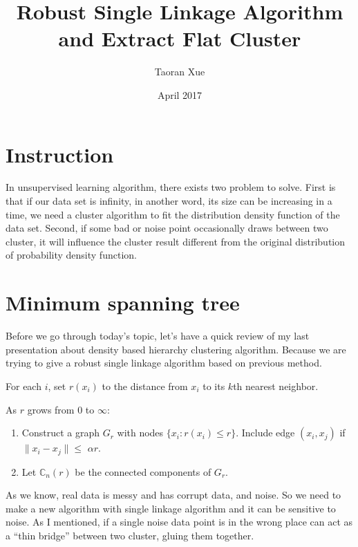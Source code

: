 \documentclass{article}
\title{Robust Single Linkage Algorithm and Extract Flat Cluster}
\author{Taoran Xue }
\date{April 2017}
\begin{document}
\maketitle

\section{Instruction}

In unsupervised learning algorithm, there exists two problem to solve. First is that if our data set is infinity, in another word, its size can be increasing in a time, we need a cluster algorithm to fit the distribution density function of the data set. Second, if some bad or noise point occasionally draws between two cluster, it will influence the cluster result different from the original distribution of probability density function.

\section{Minimum spanning tree}

Before we go through today's topic, let's have a quick review of my last presentation about density based hierarchy clustering algorithm. Because we are trying to give a robust single linkage algorithm based on previous method.



\begin{tcolorbox}
For each $i$, set $r(x_i)$ to the distance from $x_i$ to its {\color{red}$k$}th nearest neighbor.

As $r$ grows from $0$ to $\infty$:
\begin{enumerate}
	\item Construct a graph $G_r$ with nodes $\{x_i : r(x_i) \leq r\}$. Include edge $(x_i, x_j)$ if $\|x_i - x_j\| \leq$ {\color{red}$\alpha r$}.
	\item Let $\mathbb{C}_n(r)$ be the connected components of $G_r$.
\end{enumerate}  

\end{tcolorbox}

As we know, real data is messy and has corrupt data, and noise. So we need to make a new algorithm with single linkage algorithm and it can be sensitive to noise. As I mentioned, if a single noise data point is in the wrong place can act as a ``thin bridge'' between two cluster, gluing them together.
\end{document}
